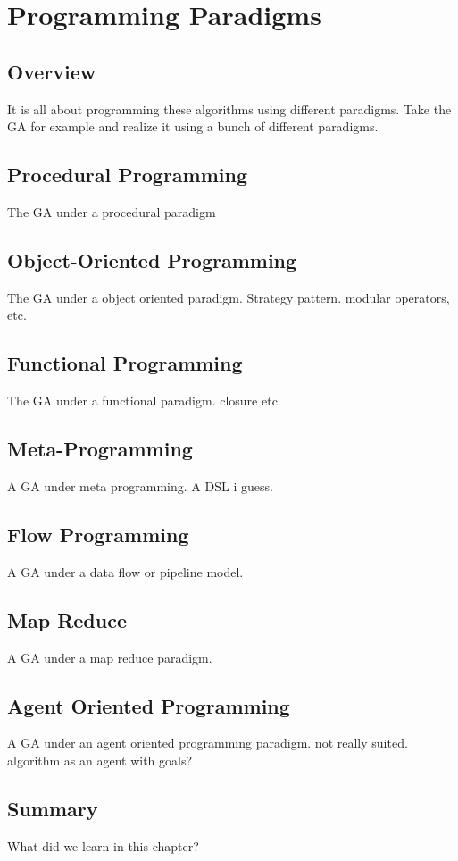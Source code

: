 


\chapter{Programming Paradigms}
\label{chap:paradigms}

\section{Overview}
It is all about programming these algorithms using different paradigms.
Take the GA for example and realize it using a bunch of different paradigms.

\section{Procedural Programming}
The GA under a procedural paradigm

\section{Object-Oriented Programming}
The GA under a object oriented paradigm. Strategy pattern. modular operators, etc.

\section{Functional Programming}
The GA under a functional paradigm. closure etc

\section{Meta-Programming}
A GA under meta programming. A DSL i guess.

\section{Flow Programming}
A GA under a data flow or pipeline model.

\section{Map Reduce}
A GA under a map reduce paradigm.

\section{Agent Oriented Programming}
A GA under an agent oriented programming paradigm. not really suited. algorithm as an agent with goals?



\section{Summary}
What did we learn in this chapter?